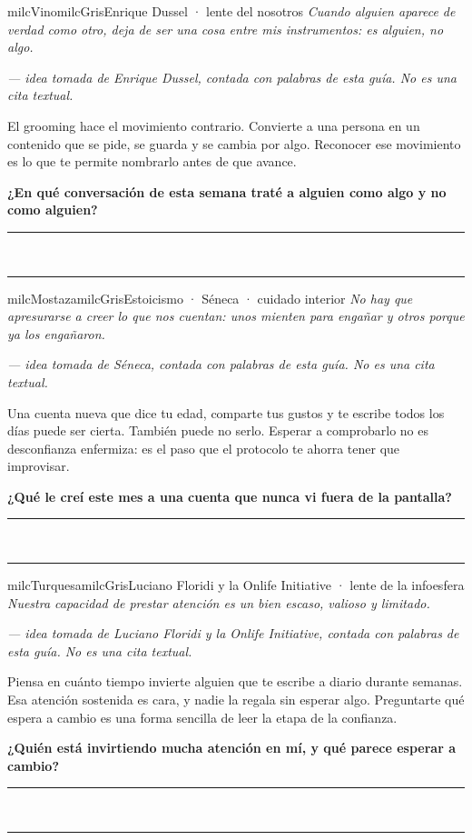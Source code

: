 \documentclass[11pt,letterpaper]{article}
\newcommand{\linead}[1]{\noindent\color{milcLinea}\rule{#1}{0.5pt}\color{milcNegro}}
\begin{document}
\begin{softbox}{milcVino}{milcGris}{Enrique Dussel · lente del nosotros}
\textit{Cuando alguien aparece de verdad como otro, deja de ser una cosa entre mis instrumentos: es alguien, no algo.}

{\footnotesize\itshape\color{milcNegro!70}--- idea tomada de Enrique Dussel, contada con palabras de esta guía. No es una cita textual.}

El grooming hace el movimiento contrario. Convierte a una persona en un contenido que se pide, se guarda y se cambia por algo. Reconocer ese movimiento es lo que te permite nombrarlo antes de que avance.

\textbf{¿En qué conversación de esta semana traté a alguien como algo y no como alguien?}
\end{softbox}
\linead{\linewidth}\\[1mm]
\linead{\linewidth}

\begin{softbox}{milcMostaza}{milcGris}{Estoicismo · Séneca · cuidado interior}
\textit{No hay que apresurarse a creer lo que nos cuentan: unos mienten para engañar y otros porque ya los engañaron.}

{\footnotesize\itshape\color{milcNegro!70}--- idea tomada de Séneca, contada con palabras de esta guía. No es una cita textual.}

Una cuenta nueva que dice tu edad, comparte tus gustos y te escribe todos los días puede ser cierta. También puede no serlo. Esperar a comprobarlo no es desconfianza enfermiza: es el paso que el protocolo te ahorra tener que improvisar.

\textbf{¿Qué le creí este mes a una cuenta que nunca vi fuera de la pantalla?}
\end{softbox}
\linead{\linewidth}\\[1mm]
\linead{\linewidth}

\begin{softbox}{milcTurquesa}{milcGris}{Luciano Floridi y la Onlife Initiative · lente de la infoesfera}
\textit{Nuestra capacidad de prestar atención es un bien escaso, valioso y limitado.}

{\footnotesize\itshape\color{milcNegro!70}--- idea tomada de Luciano Floridi y la Onlife Initiative, contada con palabras de esta guía. No es una cita textual.}

Piensa en cuánto tiempo invierte alguien que te escribe a diario durante semanas. Esa atención sostenida es cara, y nadie la regala sin esperar algo. Preguntarte qué espera a cambio es una forma sencilla de leer la etapa de la confianza.

\textbf{¿Quién está invirtiendo mucha atención en mí, y qué parece esperar a cambio?}
\end{softbox}
\linead{\linewidth}\\[1mm]
\linead{\linewidth}
\end{document}
